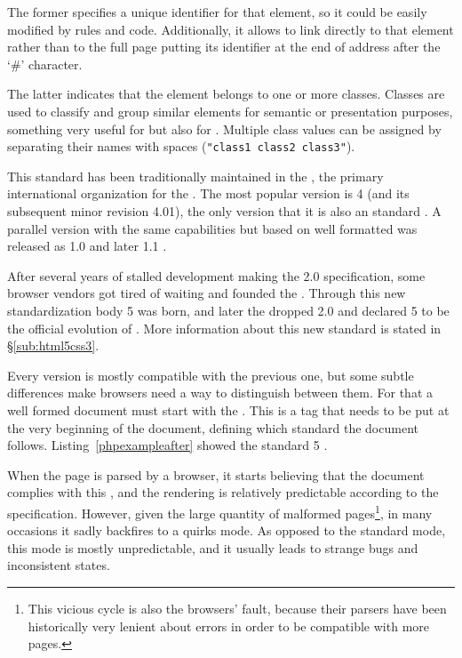 The former specifies a unique identifier for that element, so it could be easily modified by  rules and  code.
Additionally, it allows to link directly to that element rather than to the full page putting its identifier at the end of address after the `\#' character.

The latter indicates that the element belongs to one or more classes.
Classes are used to classify and group similar elements for semantic or presentation purposes, something very useful for  but also for .
Multiple class values can be assigned by separating their names with spaces (\texttt{"class1 class2 class3"}).

This standard has been traditionally maintained in the , the primary international organization for the .
The most popular version is  4 (and its subsequent minor revision  4.01), the only version that it is also an  standard  \cite{HTML4}.
A parallel version with the same capabilities but based on well formatted  was released as  1.0 and later  1.1  \cite{HTML4}.

After several years of stalled development making the  2.0 specification, some browser vendors got tired of waiting and founded the .
Through this new standardization body  5 was born, and later the  dropped  2.0 and declared  5 to be the official evolution of .
More information about this new standard is stated in \S\vref{sub:html5css3}.

Every version is mostly compatible with the previous one, but some subtle differences make browsers need a way to distinguish between them.
For that a well formed  document must start with the .
This is a tag that needs to be put at the very beginning of the document, defining which standard the document follows.
Listing~\vref{phpexampleafter} showed the standard  5 .

When the page is parsed by a browser, it starts believing that the document complies with this , and the rendering is relatively predictable according to the specification.
However, given the large quantity of malformed pages\footnote{This vicious cycle is also the browsers' fault, because their parsers have been historically very lenient about  errors in order to be compatible with more pages.}, in many occasions it sadly backfires to a quirks mode.
As opposed to the standard mode, this mode is mostly unpredictable, and it usually leads to strange bugs and inconsistent states.

